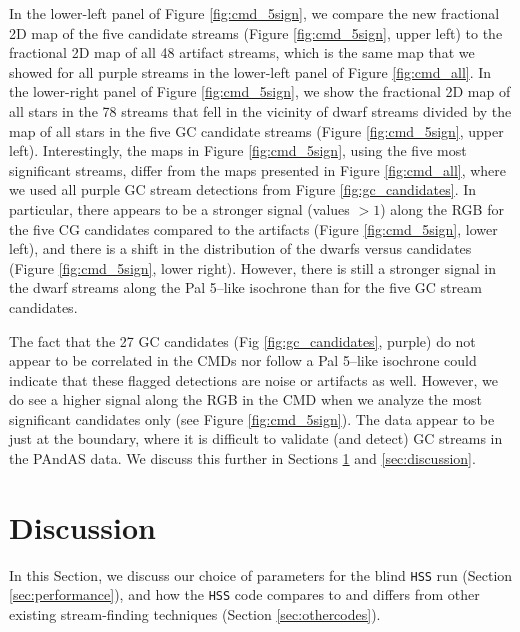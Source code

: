 \documentclass[twocolumn]{aastex631}
\begin{document}
In the lower-left panel of Figure \ref{fig:cmd_5sign}, we compare the new fractional 2D map of the five candidate streams (Figure \ref{fig:cmd_5sign}, upper left) to the fractional 2D map of all 48 artifact streams, which is the same map that we showed for all purple streams in the lower-left panel of Figure \ref{fig:cmd_all}. In the lower-right panel of Figure \ref{fig:cmd_5sign}, we show the fractional 2D map of all stars in the 78 streams that fell in the vicinity of dwarf streams divided by the map of all stars in the five GC candidate streams (Figure  \ref{fig:cmd_5sign}, upper left). Interestingly, the maps in Figure \ref{fig:cmd_5sign}, using the five most significant streams, differ from the maps presented in Figure \ref{fig:cmd_all}, where we used all purple GC stream detections from Figure \ref{fig:gc_candidates}. In particular, there appears to be a stronger signal (values $>1$) along the RGB for the five CG candidates compared to the artifacts (Figure \ref{fig:cmd_5sign}, lower left), and there is a shift in the distribution of the dwarfs versus candidates (Figure \ref{fig:cmd_5sign}, lower right). However, there is still a stronger signal in the dwarf streams along the Pal 5--like isochrone than for the five GC stream candidates. 


The fact that the 27 GC candidates (Fig \ref{fig:gc_candidates}, purple) do not appear to be correlated in the CMDs nor follow a Pal 5--like isochrone could indicate that these flagged detections are noise or artifacts as well. However, we do see a higher signal along the RGB in the CMD when we analyze the most significant candidates only (see Figure \ref{fig:cmd_5sign}). 
The data appear to be just at the boundary, where it is difficult to validate (and detect) GC streams in the PAndAS data. We discuss this further in Sections \ref{sec:newdiscussion} and \ref{sec:discussion}. 



\section{Discussion}\label{sec:newdiscussion}
In this Section, we discuss our choice of parameters for the blind \texttt{HSS} run (Section \ref{sec:performance}), and how the \texttt{HSS} code compares to and differs from other existing stream-finding techniques (Section \ref{sec:othercodes}).
\end{document}
